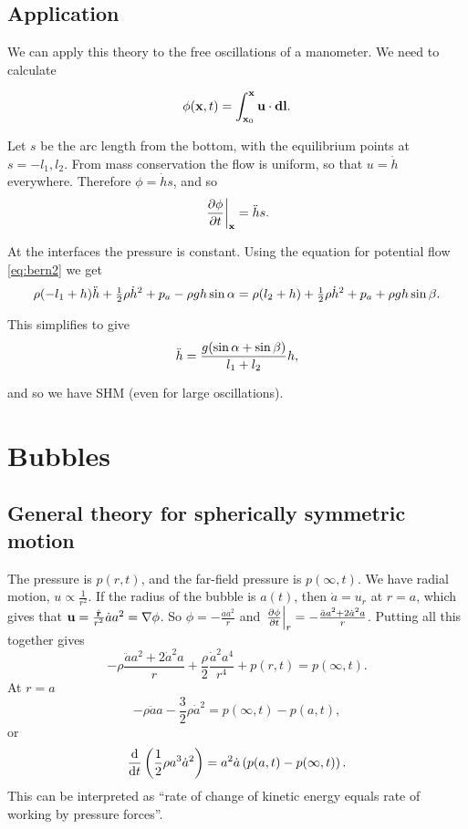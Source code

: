 \documentclass{notes}
\newcommand{\grad}{\nabla}
\begin{document}
\subsection*{Application}

\vspace{1.5in}

We can apply this theory to the free oscillations of a manometer.  We
need to calculate

\[
\phi(\mathbf{x},t) = \int_{\mathbf{x}_0}^{\mathbf{x}} \mathbf{u} \cdot \mathbf{dl}.
\]

Let $s$ be the arc length from the bottom, with the equilibrium points at
$s = -l_1, l_2$.  From mass conservation the flow is uniform, so that
$u = \dot{h}$ everywhere.  Therefore $\phi = \dot{h} s$, and so
\[
\left.\frac{\partial \phi}{\partial t}\right|_{\mathbf{x}} = \Ddot{h} s.
\]

At the interfaces the pressure is constant.  Using the equation for
potential flow \eqref{eq:bern2} we get
\[
\rho (-l_1 + h) \Ddot{h} + \tfrac{1}{2} \rho \Dot{h}^2 + p_a -
  \rho g h \sin \alpha = \rho (l_2 + h) + \tfrac{1}{2} \rho \Dot{h}^2
  + p_a + \rho g h \sin \beta.
\]

This simplifies to give
\[
\Ddot{h} = \frac{g (\sin \alpha + \sin \beta)}{l_1 + l_2} h,
\]

and so we have SHM (even for large oscillations).

\section{Bubbles}

\subsection{General theory for spherically symmetric motion}

The pressure is $p(r,t)$, and the far-field pressure is $p(\infty,t)$.
We have radial motion, $u \propto \frac{1}{r^2}$.  If the radius of
the bubble is $a(t)$, then $\dot{a} = u_r$ at $r=a$, which gives that
$\vu = \frac{\hat{\vect{r}}}{r^2}\dot{a}a^2 = \grad \phi$.  So $\phi =
- \frac{\dot{a}a^2}{r}$ and $\left.\frac{\partial \phi}{\partial t}\right|_r =
-\frac{\ddot{a}a^2 + 2\dot{a}^2 a}{r}$.  Putting all this together
gives
\[
-\rho \frac{\ddot{a}a^2 + 2\dot{a}^2 a}{r} +\frac{\rho}{2}
\frac{\dot{a}^2 a^4}{r^4} + p(r,t) = p(\infty,t).
\]
At $r=a$
\[
-\rho \ddot{a}a -\frac{3}{2} \rho \dot{a}^2 = p(\infty,t) - p(a,t),
\]
or
\[
\frac{\mathrm{d}}{\mathrm{d} t}\left( \frac{1}{2}\rho a^3 \dot{a}^2 \right) = a^2
\dot{a} \left( p(a,t) - p(\infty,t) \right).
\]
This can be interpreted as ``rate of change of kinetic energy equals
rate of working by pressure forces''.
\end{document}
